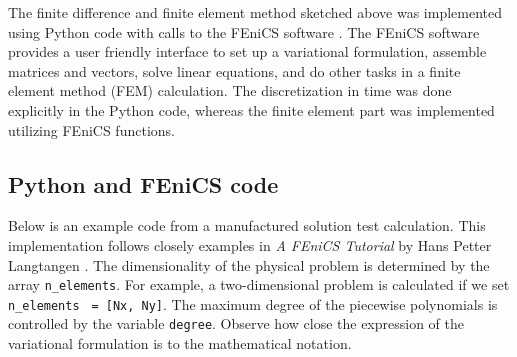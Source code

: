 \documentclass[twoside]{article}
\begin{document}
The finite difference and finite element method sketched above was implemented using Python code with calls to the FEniCS software \cite{fenics}. The FEniCS software provides a user friendly interface to set up a variational formulation, assemble matrices and vectors, solve linear equations, and do other tasks in a finite element method (FEM) calculation. The discretization in time was done explicitly in the Python code, whereas the finite element part was implemented utilizing FEniCS functions.  

\subsection{Python and FEniCS code}


Below is an example code from a manufactured solution test calculation. This implementation follows closely examples in \emph{A FEniCS Tutorial} by Hans Petter Langtangen \cite{tutorial}. The dimensionality of the physical problem is determined by the array \verb+n_elements+. For example, a two-dimensional problem is calculated if we set \verb+n_elements+ \verb+ = [Nx, Ny]+. The maximum degree of the piecewise polynomials is controlled by the variable \verb+degree+. Observe how close the expression of the variational formulation is to the mathematical notation.
\end{document}
